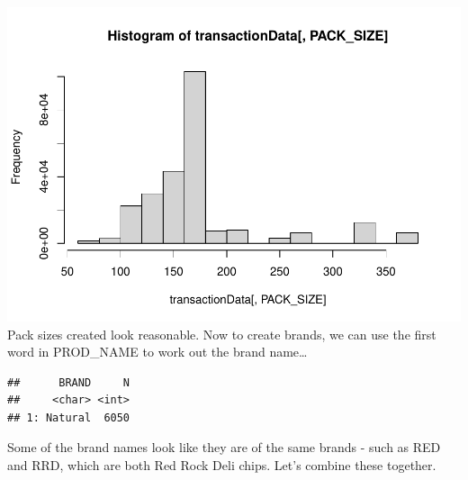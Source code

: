 \documentclass[
]{article}
\newenvironment{Shaded}{\begin{snugshade}}{\end{snugshade}}
\newcommand{\CommentTok}[1]{\textcolor[rgb]{0.56,0.35,0.01}{\textit{#1}}}
\newcommand{\DocumentationTok}[1]{\textcolor[rgb]{0.56,0.35,0.01}{\textbf{\textit{#1}}}}
\newcommand{\FunctionTok}[1]{\textcolor[rgb]{0.13,0.29,0.53}{\textbf{#1}}}
\newcommand{\NormalTok}[1]{#1}
\newcommand{\OtherTok}[1]{\textcolor[rgb]{0.56,0.35,0.01}{#1}}
\newcommand{\SpecialCharTok}[1]{\textcolor[rgb]{0.81,0.36,0.00}{\textbf{#1}}}
\newcommand{\StringTok}[1]{\textcolor[rgb]{0.31,0.60,0.02}{#1}}
\begin{document}
\includegraphics{InsideSherpa_Task1_files/figure-latex/unnamed-chunk-12-1.pdf}
Pack sizes created look reasonable. Now to create brands, we can use the
first word in PROD\_NAME to work out the brand name\ldots{}

\begin{Shaded}
\end{Shaded}

\begin{verbatim}
##      BRAND     N
##     <char> <int>
## 1: Natural  6050
\end{verbatim}

Some of the brand names look like they are of the same brands - such as
RED and RRD, which are both Red Rock Deli chips. Let's combine these
together.
\end{document}
